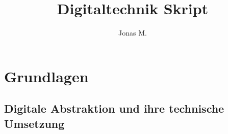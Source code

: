 \documentclass[11pt,a4paper]{article}
\title{Digitaltechnik Skript}
\author{Jonas M.}
\date{}
\begin{document}
\maketitle
{} %
\tableofcontents
\clearpage
{} %





\section{Grundlagen}
\subsection{Digitale Abstraktion und ihre technische Umsetzung}
\end{document}
